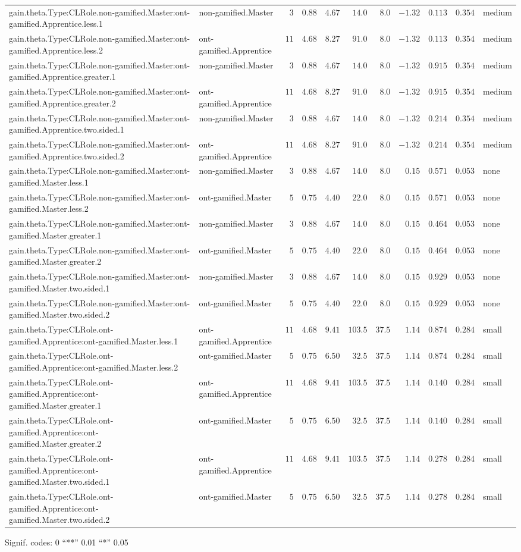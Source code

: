 \documentclass[6pt]{article}
\begin{document}
\begin{landscape}
{\begin{longtable}{llrrrrrrrrl}
gain.theta.Type:CLRole.non-gamified.Master:ont-gamified.Apprentice.less.1&non-gamified.Master&$ 3$&$0.88$&$ 4.67$&$ 14.0$&$  8.0$&$-1.32$&$0.113$&$0.354$&medium\tabularnewline
gain.theta.Type:CLRole.non-gamified.Master:ont-gamified.Apprentice.less.2&ont-gamified.Apprentice&$11$&$4.68$&$ 8.27$&$ 91.0$&$  8.0$&$-1.32$&$0.113$&$0.354$&medium\tabularnewline
gain.theta.Type:CLRole.non-gamified.Master:ont-gamified.Apprentice.greater.1&non-gamified.Master&$ 3$&$0.88$&$ 4.67$&$ 14.0$&$  8.0$&$-1.32$&$0.915$&$0.354$&medium\tabularnewline
gain.theta.Type:CLRole.non-gamified.Master:ont-gamified.Apprentice.greater.2&ont-gamified.Apprentice&$11$&$4.68$&$ 8.27$&$ 91.0$&$  8.0$&$-1.32$&$0.915$&$0.354$&medium\tabularnewline
gain.theta.Type:CLRole.non-gamified.Master:ont-gamified.Apprentice.two.sided.1&non-gamified.Master&$ 3$&$0.88$&$ 4.67$&$ 14.0$&$  8.0$&$-1.32$&$0.214$&$0.354$&medium\tabularnewline
gain.theta.Type:CLRole.non-gamified.Master:ont-gamified.Apprentice.two.sided.2&ont-gamified.Apprentice&$11$&$4.68$&$ 8.27$&$ 91.0$&$  8.0$&$-1.32$&$0.214$&$0.354$&medium\tabularnewline
gain.theta.Type:CLRole.non-gamified.Master:ont-gamified.Master.less.1&non-gamified.Master&$ 3$&$0.88$&$ 4.67$&$ 14.0$&$  8.0$&$ 0.15$&$0.571$&$0.053$&none\tabularnewline
gain.theta.Type:CLRole.non-gamified.Master:ont-gamified.Master.less.2&ont-gamified.Master&$ 5$&$0.75$&$ 4.40$&$ 22.0$&$  8.0$&$ 0.15$&$0.571$&$0.053$&none\tabularnewline
gain.theta.Type:CLRole.non-gamified.Master:ont-gamified.Master.greater.1&non-gamified.Master&$ 3$&$0.88$&$ 4.67$&$ 14.0$&$  8.0$&$ 0.15$&$0.464$&$0.053$&none\tabularnewline
gain.theta.Type:CLRole.non-gamified.Master:ont-gamified.Master.greater.2&ont-gamified.Master&$ 5$&$0.75$&$ 4.40$&$ 22.0$&$  8.0$&$ 0.15$&$0.464$&$0.053$&none\tabularnewline
gain.theta.Type:CLRole.non-gamified.Master:ont-gamified.Master.two.sided.1&non-gamified.Master&$ 3$&$0.88$&$ 4.67$&$ 14.0$&$  8.0$&$ 0.15$&$0.929$&$0.053$&none\tabularnewline
gain.theta.Type:CLRole.non-gamified.Master:ont-gamified.Master.two.sided.2&ont-gamified.Master&$ 5$&$0.75$&$ 4.40$&$ 22.0$&$  8.0$&$ 0.15$&$0.929$&$0.053$&none\tabularnewline
gain.theta.Type:CLRole.ont-gamified.Apprentice:ont-gamified.Master.less.1&ont-gamified.Apprentice&$11$&$4.68$&$ 9.41$&$103.5$&$ 37.5$&$ 1.14$&$0.874$&$0.284$&small\tabularnewline
gain.theta.Type:CLRole.ont-gamified.Apprentice:ont-gamified.Master.less.2&ont-gamified.Master&$ 5$&$0.75$&$ 6.50$&$ 32.5$&$ 37.5$&$ 1.14$&$0.874$&$0.284$&small\tabularnewline
gain.theta.Type:CLRole.ont-gamified.Apprentice:ont-gamified.Master.greater.1&ont-gamified.Apprentice&$11$&$4.68$&$ 9.41$&$103.5$&$ 37.5$&$ 1.14$&$0.140$&$0.284$&small\tabularnewline
gain.theta.Type:CLRole.ont-gamified.Apprentice:ont-gamified.Master.greater.2&ont-gamified.Master&$ 5$&$0.75$&$ 6.50$&$ 32.5$&$ 37.5$&$ 1.14$&$0.140$&$0.284$&small\tabularnewline
\newpage
gain.theta.Type:CLRole.ont-gamified.Apprentice:ont-gamified.Master.two.sided.1&ont-gamified.Apprentice&$11$&$4.68$&$ 9.41$&$103.5$&$ 37.5$&$ 1.14$&$0.278$&$0.284$&small\tabularnewline
gain.theta.Type:CLRole.ont-gamified.Apprentice:ont-gamified.Master.two.sided.2&ont-gamified.Master&$ 5$&$0.75$&$ 6.50$&$ 32.5$&$ 37.5$&$ 1.14$&$0.278$&$0.284$&small\tabularnewline
\hline
\end{longtable}}\end{landscape}
\begin{flushright}{ \tiny{ Signif. codes:  0 ``**'' 0.01 ``*'' 0.05 }}\end{flushright} 
\end{document}
